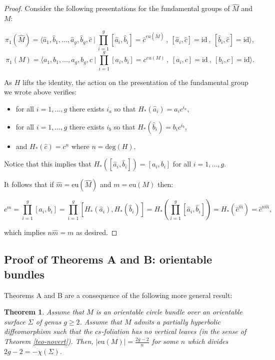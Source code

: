 \documentclass[11pt]{amsart} %
\numberwithin{equation}{section}
\newtheorem{teo}[equation]{Theorem}
\theoremstyle{remark}
\begin{document}
\begin{proof}
Consider the following presentations for the fundamental groups of $\hat M$ and $M$:

\[ \pi_1(\hat M) = \bigg \langle \hat a_1,\hat b_1, \ldots, \hat a_g, \hat b_g, \hat c \  | \  \prod_{i=1}^g [\hat a_i,\hat b_i] = \hat c^{eu(\hat M)} \ , \ [\hat a_i,\hat c]= \mathrm{id} \ , \ [\hat b_i,\hat c]=\mathrm{id} \bigg \rangle ,  \]
 \[ \pi_1(M) = \bigg \langle a_1,b_1, \ldots, a_g, b_g, c \  | \  \prod_{i=1}^g [a_i,b_i] = c^{eu(M)} \ , \ [a_i,c]= \mathrm{id} \ , \ [b_i,c]=\mathrm{id} \bigg \rangle.  \]

As $H$ lifts the identity, the action on the presentation of the fundamental group we wrote above verifies:
\begin{itemize}
\item for all $i=1,\ldots, g$ there exists $i_a$ so that  $H_\ast (\hat a_i) =a_i c^{i_a}$,
\item for all $i=1,\ldots, g$ there exists $i_b$ so that  $H_\ast(\hat b_i)=b_i c^{i_b}$,
\item and $H_\ast(\hat c)=c^n$ where $n=\mathrm{deg}(H)$. 
\end{itemize}

Notice that this implies that $H_\ast([\hat a_i,\hat b_i]) = [a_i,b_i]$ for all $i=1,\ldots, g$. 

It follows that if $\hat m = \mathrm{eu}(\hat M)$ and $m=\mathrm{eu}(M)$ then:

\[ c^{ m} =  \prod_{i=1}^g [ a_i, b_i]  =  \prod_{i=1}^g [H_\ast(\hat a_i), H_\ast(\hat b_i)] = H_\ast \left(  \prod_{i=1}^g [\hat a_i,\hat b_i] \right) = H_\ast( \hat c^{ \hat m}) = \hat c^{n \hat m}, \]

 \noindent which implies $n \hat m = m$ as desired. 
\end{proof}

%

%
%
%

\subsection{Proof of Theorems A and B: orientable bundles}\label{ss.ABorientable} 


Theorems A and B are a consequence of the following more general result: 

\begin{teo}\label{teo-horizimpliesanosov} 
Assume that $M$ is an orientable circle bundle over an orientable surface $\Sigma$ of genus $g\geq 2$. Assume that $M$ admits a partially hyperbolic diffeomorphism such that the $cs$-foliation has no vertical leaves (in the sense of Theorem \ref{teo-novert}). Then,
$|\mathrm{eu}(M)| = \frac{2g-2}{n}$ for some $n$ which divides $2g-2=-\chi(\Sigma)$. 
\end{teo}
\end{document}
